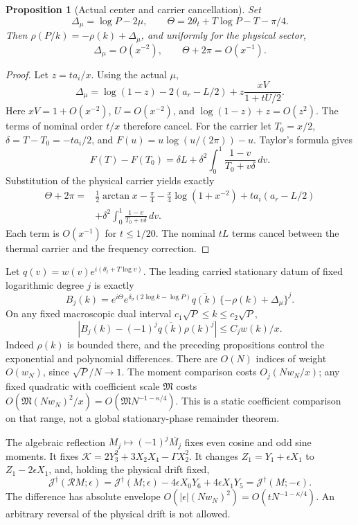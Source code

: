 \documentclass[11pt]{article}
\numberwithin{equation}{section}
\newtheorem{proposition}[theorem]{Proposition}
\theoremstyle{definition}
\theoremstyle{remark}
\newcommand{\dd}{\,d}
\begin{document}
\begin{proposition}[Actual center and carrier cancellation]
\label{sr:reflection}
Set
\[
\Delta_\mu=\log P-2\mu,\qquad
\Theta=2\theta_t+T\log P-T-\pi/4 .
\]
Then $\rho(P/k)=-\rho(k)+\Delta_\mu$, and uniformly for the
physical sector,
\[
\Delta_\mu=O(x^{-2}),\qquad \Theta+2\pi=O(x^{-1}).
\]
\end{proposition}
\begin{proof}
Let $z=ta_i/x$. Using the actual $\mu$,
\[
\Delta_\mu=\log(1-z)-2(a_r-L/2)
                     +z\frac{xV}{1+tU/2}.
\]
Here $xV=1+O(x^{-2})$, $U=O(x^{-2})$, and
$\log(1-z)+z=O(z^2)$. The terms of nominal order $t/x$
therefore cancel.
For the carrier let $T_0=x/2$, $\delta=T-T_0=-ta_i/2$, and
$F(u)=u\log(u/(2\pi))-u$. Taylor's formula gives
\[
F(T)-F(T_0)=\delta L+
\delta^2\int_0^1\frac{1-v}{T_0+v\delta}\dd v.
\]
Substitution of the physical carrier yields exactly
\[
\begin{split}
\Theta+2\pi={}&\tfrac12\arctan x-\tfrac\pi4
 -\frac x4\log(1+x^{-2})+ta_i(a_r-L/2)\\
 &+\delta^2\int_0^1\frac{1-v}{T_0+v\delta}\dd v .
\end{split}
\]
Each term is $O(x^{-1})$ for $t\le1/20$. The nominal $tL$
terms cancel between the thermal carrier and the frequency correction.
\end{proof}

Let $q(v)=w(v)e^{i(\theta_t+T\log v)}$.
The leading carried stationary datum of fixed logarithmic degree $j$ is
exactly
\[
B_j(k)= e^{i\Theta}e^{\delta_\sigma(2\log k-\log P)}
                    \overline{q(k)}\,\{-\rho(k)+\Delta_\mu\}^{j}.
\]
On any fixed macroscopic dual interval
$c_1\sqrt P\le k\le c_2\sqrt P$,
\[
|B_j(k)-(-1)^j\overline{q(k)}\rho(k)^j|\le C_jw(k)/x.
\]
Indeed $\rho(k)$ is bounded there, and the preceding propositions
control the exponential and polynomial differences. There are $O(N)$
indices of weight $O(w_N)$, since $\sqrt P/N\to1$.
The moment comparison costs $O_j(Nw_N/x)$; any fixed quadratic
with coefficient scale $\mathfrak M$ costs
$O(\mathfrak M(Nw_N)^2/x)=O(\mathfrak M N^{-1-\kappa/4})$.
This is a static coefficient comparison on that range, not a global
stationary-phase remainder theorem.

The algebraic reflection $M_j\mapsto(-1)^j\overline{M_j}$
fixes even cosine and odd sine moments. It fixes
$\mathcal K=2Y_3^2+3X_2X_4-\Gamma X_2^2$.
It changes $Z_1=Y_1+\epsilon X_1$ to $Z_1-2\epsilon X_1$,
and, holding the physical drift fixed,
\[
\mathcal J^\dagger(\mathcal R M;\epsilon)
=\mathcal J^\dagger(M;\epsilon)-4\epsilon X_0Y_6
                                      +4\epsilon X_1Y_5
=\mathcal J^\dagger(M;-\epsilon).
\]
The difference has absolute envelope
$O(|\epsilon|(Nw_N)^2)=O(tN^{-1-\kappa/4})$.
An arbitrary reversal of the physical drift is not allowed.
\end{document}
